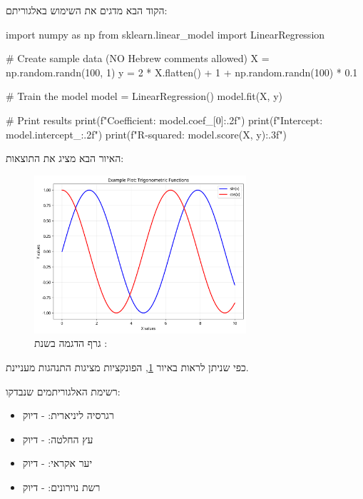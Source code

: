 \documentclass{hebrew-academic-template}
\begin{document}

הקוד הבא מדגים את השימוש באלגוריתם:

\begin{pythonbox}
import numpy as np
from sklearn.linear_model import LinearRegression

# Create sample data (NO Hebrew comments allowed)
X = np.random.randn(100, 1)
y = 2 * X.flatten() + 1 + np.random.randn(100) * 0.1

# Train the model
model = LinearRegression()
model.fit(X, y)

# Print results
print(f"Coefficient: {model.coef_[0]:.2f}")
print(f"Intercept: {model.intercept_:.2f}")
print(f"R-squared: {model.score(X, y):.3f}")
\end{pythonbox}



האיור הבא מציג את התוצאות:

\begin{figure}[h]
\centering
\includegraphics[width=0.7\textwidth]{example_plot.png}
\caption{גרף הדגמה בשנת : }
\label{fig:example}
\end{figure}

כפי שניתן לראות באיור \ref{fig:example}, הפונקציות מציגות התנהגות מעניינת.



רשימת האלגוריתמים שנבדקו:

\begin{itemize}
\item רגרסיה ליניארית:  - דיוק 
\item עץ החלטה:  - דיוק 
\item יער אקראי:  - דיוק 
\item רשת נוירונים:  - דיוק 
\end{itemize}
\end{document}
